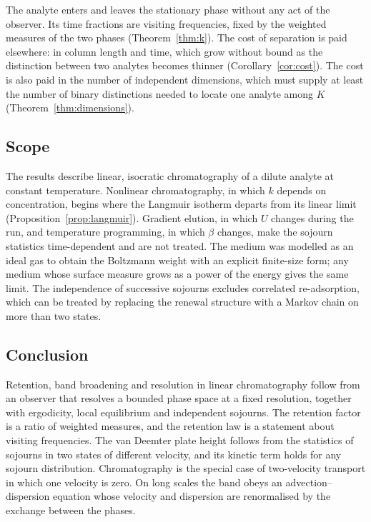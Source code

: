 \documentclass[11pt,a4paper]{article}
\theoremstyle{definition}
\theoremstyle{remark}
\begin{document}
The analyte enters and leaves the stationary phase without any act of the observer.
Its time fractions are visiting frequencies, fixed by the weighted measures of the two phases (Theorem~\ref{thm:k}).
The cost of separation is paid elsewhere: in column length and time, which grow without bound as the distinction between two analytes becomes thinner (Corollary~\ref{cor:cost}).
The cost is also paid in the number of independent dimensions, which must supply at least the number of binary distinctions needed to locate one analyte among $K$ (Theorem~\ref{thm:dimensions}).

\subsection{Scope}

The results describe linear, isocratic chromatography of a dilute analyte at constant temperature.
Nonlinear chromatography, in which $k$ depends on concentration, begins where the Langmuir isotherm departs from its linear limit (Proposition~\ref{prop:langmuir}).
Gradient elution, in which $U$ changes during the run, and temperature programming, in which $\beta$ changes, make the sojourn statistics time-dependent and are not treated.
The medium was modelled as an ideal gas to obtain the Boltzmann weight with an explicit finite-size form; any medium whose surface measure grows as a power of the energy gives the same limit.
The independence of successive sojourns excludes correlated re-adsorption, which can be treated by replacing the renewal structure with a Markov chain on more than two states.

\subsection{Conclusion}

Retention, band broadening and resolution in linear chromatography follow from an observer that resolves a bounded phase space at a fixed resolution, together with ergodicity, local equilibrium and independent sojourns.
The retention factor is a ratio of weighted measures, and the retention law is a statement about visiting frequencies.
The van Deemter plate height follows from the statistics of sojourns in two states of different velocity, and its kinetic term holds for any sojourn distribution.
Chromatography is the special case of two-velocity transport in which one velocity is zero.
On long scales the band obeys an advection--dispersion equation whose velocity and dispersion are renormalised by the exchange between the phases.



\end{document}
